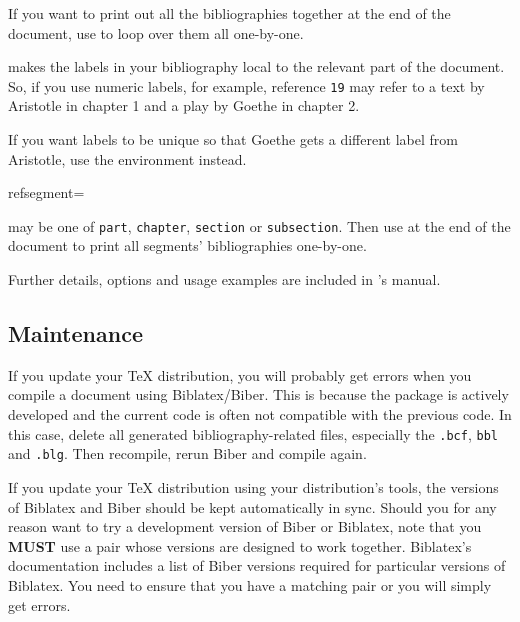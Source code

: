 If you want to print out all the bibliographies together at the end of the document, use  to loop over them all one-by-one.

 makes the labels in your bibliography local to the relevant part of the document.
So, if you use numeric labels, for example, reference \texttt{19} may refer to a text by Aristotle in chapter 1 and a play by Goethe in chapter 2.

If you want labels to be unique so that Goethe gets a different label from Aristotle, use the  environment instead.
\begin{semiverbatim}
  refsegment=
\end{semiverbatim}
 may be one of \texttt{part}, \texttt{chapter}, \texttt{section} or \texttt{subsection}.
Then use  at the end of the document to print all segments' bibliographies one-by-one.

Further details, options and usage examples are included in 's manual.


\subsection{Maintenance}\label{subsec:maintain}


If you update your \TeX{} distribution, you will probably get errors when you compile a document using Biblatex/Biber.
This is because the package is actively developed and the current code is often not compatible with the previous code.
In this case, delete all generated bibliography-related files, especially the \texttt{.bcf}, \texttt{bbl} and \texttt{.blg}.
Then recompile, rerun Biber and compile again.

If you update your \TeX{} distribution using your distribution's tools, the versions of Biblatex and Biber should be kept automatically in sync.
Should you for any reason want to try a development version of Biber or Biblatex, note that you \textbf{MUST} use a pair whose versions are designed to work together.
Biblatex's documentation includes a list of Biber versions required for particular versions of Biblatex.
You need to ensure that you have a matching pair or you will simply get errors.




